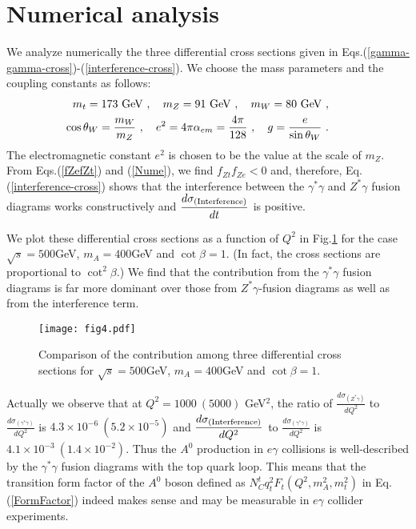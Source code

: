 \documentclass[final,5p,times,twocolumn]{elsarticle}
\newcommand{\bea}{\begin{eqnarray}}
\newcommand{\eea}{\end{eqnarray}}
\newcommand{\nn}{\nonumber}
\begin{document}
\section{Numerical analysis}
We analyze numerically the three differential cross sections given in Eqs.(\ref{gamma-gamma-cross})-(\ref{interference-cross}). We choose the mass parameters and the coupling constants as follows:
\bea
&&\hspace{-1cm} m_t=173~{\rm GeV}~,\quad m_Z=91~{\rm GeV}~,\quad m_W=80~{\rm GeV}~,\nn\\
&&\hspace{-1cm} \cos\theta_W=\frac{m_W}{m_Z}~,\quad e^2=4\pi\alpha_{em}=\frac{4\pi}{128}~,\quad 
g=\frac{e}{\sin\theta_W}~.\label{Nume}
\eea
The electromagnetic constant $e^2$ is chosen to be the value at the scale of 
$m_Z$. 
From Eqs.(\ref{fZefZt}) and (\ref{Nume}), we find $ f_{Zt} f_{Ze}<0$ and, therefore,  
Eq.(\ref{interference-cross}) shows that the interference between the $\gamma^* \gamma$ and $Z^* \gamma$ fusion diagrams works constructively and $\displaystyle{\frac{d\sigma_{({\rm Interference})}}{dt}}$ is positive.

We plot these differential cross sections as a function of $Q^2$ in Fig.\ref{3-processes} for the case
$\sqrt{s}=500$GeV, $m_A=400$GeV and $\cot\beta=1$.  (In fact,  the cross sections are proportional to 
$\cot^2\beta$.) 
We find that the contribution from the $\gamma^*\gamma$ fusion diagrams is far
more dominant over those from $Z^*\gamma$-fusion diagrams as well as from the interference 
term.
\begin{figure}[hbt]
\begin{center}
\texttt{[image: fig4.pdf]}
\vspace{-1.5cm}
\caption{Comparison of the contribution among three differential cross sections for $\sqrt{s}=500$GeV, $m_A=400$GeV and $\cot\beta=1$.}
\label{3-processes} 
\end{center}
\end{figure}
Actually we observe that at $Q^2=1000\ (5000)$ GeV$^2$,  the ratio of
$\displaystyle{\frac{d\sigma_{(Z^*\gamma)}}{dQ^2}}$ to 
$\displaystyle{\frac{d\sigma_{(\gamma^*\gamma)}}{dQ^2}}$ is 
$4.3\times 10^{-6}\ (5.2\times 10^{-5})$ 
and $\displaystyle{\frac{d\sigma_{({\rm Interference})}}{dQ^2}}$ to 
$\displaystyle{\frac{d\sigma_{(\gamma^*\gamma)}}{dQ^2}}$ is $4.1\times 10^{-3}\ (1.4\times 10^{-2})$. 
Thus the $A^0$ production in $e\gamma$ collisions is well-described by the 
$\gamma^*\gamma$ fusion diagrams with the top quark loop. 
This means that the transition form factor of the $A^0$ boson defined as $N^t_Cq_t^2 F_t(Q^2,m_A^2, m_t^2)$ 
in Eq.(\ref{FormFactor}) indeed makes sense and may be measurable in  $e\gamma$ collider experiments.  
\end{document}
